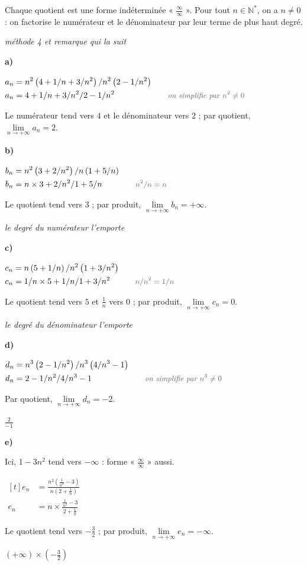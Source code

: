 \documentclass[11pt,a4paper]{article}
\newcommand{\Ns}{\mathbb{N}^{*}}
\newcounter{exo}
\newenvironment{exo}[1][\relax]{\refstepcounter{exo}\begin{exercice}[#1]}{\end{exercice}}
\newcommand{\res}[1]{{\color{coulRep}#1}}
\newenvironment{calculs}{\par\smallskip\noindent$\displaystyle\begin{aligned}[t]}%
  {\end{aligned}$\par\smallskip}
\newcommand{\justif}[1]{\quad\text{\small\itshape\color{black!60}#1}}
\newcommand{\cas}[1]{\par\smallskip\noindent\textbf{\color{coulExo}#1}\vadjust{\nobreak}}
\newcommand{\explique}[2]{\par\smallskip\noindent
  \begin{minipage}[t]{0.6\linewidth}\raggedright #1\end{minipage}\hfill
  \begin{minipage}[t]{0.37\linewidth}\raggedright\leavevmode
    {\small\itshape\color{black!60}#2}\end{minipage}\par}
\let\casligne\cas
\renewcommand{\cas}[1]{\casligne{#1}\par\nopagebreak}
\newcommand{\limn}{\lim\limits_{n\to+\infty}}
\begin{document}
\begin{exo}[Quotients]
\explique{Chaque quotient est une forme indéterminée « $\frac{\infty}{\infty}$ ». Pour tout
$n\in\Ns$, on a $n\neq 0$ : on factorise le numérateur et le dénominateur par leur terme de
plus haut degré.}{méthode 4 et remarque qui la suit}
\cas{a)}
\begin{calculs}
a_{n} &= \frac{n^{2}\left(4+\frac{1}{n}+\frac{3}{n^{2}}\right)}{n^{2}\left(2-\frac{1}{n^{2}}\right)} &&\\
a_{n} &= \frac{4+\frac{1}{n}+\frac{3}{n^{2}}}{2-\frac{1}{n^{2}}} &&\justif{on simplifie par $n^{2}\neq 0$}
\end{calculs}
\explique{Le numérateur tend vers $4$ et le dénominateur vers $2$ ; par quotient,
\res{$\limn a_{n}=2$}.}{}
\cas{b)}
\begin{calculs}
b_{n} &= \frac{n^{2}\left(3+\frac{2}{n^{2}}\right)}{n\left(1+\frac{5}{n}\right)} &&\\
b_{n} &= n\times\frac{3+\frac{2}{n^{2}}}{1+\frac{5}{n}} &&\justif{$\frac{n^{2}}{n}=n$}
\end{calculs}
\explique{Le quotient tend vers $3$ ; par produit, \res{$\limn b_{n}=+\infty$}.}{le degré du
numérateur l'emporte}
\cas{c)}
\begin{calculs}
c_{n} &= \frac{n\left(5+\frac{1}{n}\right)}{n^{2}\left(1+\frac{3}{n^{2}}\right)} &&\\
c_{n} &= \frac{1}{n}\times\frac{5+\frac{1}{n}}{1+\frac{3}{n^{2}}} &&\justif{$\frac{n}{n^{2}}=\frac{1}{n}$}
\end{calculs}
\explique{Le quotient tend vers $5$ et $\frac{1}{n}$ vers $0$ ; par produit,
\res{$\limn c_{n}=0$}.}{le degré du dénominateur l'emporte}
\cas{d)}
\begin{calculs}
d_{n} &= \frac{n^{3}\left(2-\frac{1}{n^{2}}\right)}{n^{3}\left(\frac{4}{n^{3}}-1\right)} &&\\
d_{n} &= \frac{2-\frac{1}{n^{2}}}{\frac{4}{n^{3}}-1} &&\justif{on simplifie par $n^{3}\neq 0$}
\end{calculs}
\explique{Par quotient, \res{$\limn d_{n}=-2$}.}{$\frac{2}{-1}$}
\cas{e)}
\explique{Ici, $1-3n^{2}$ tend vers $-\infty$ : forme « $\frac{\infty}{\infty}$ » aussi.}{}
\begin{calculs}
e_{n} &= \frac{n^{2}\left(\frac{1}{n^{2}}-3\right)}{n\left(2+\frac{1}{n}\right)} &&\\
e_{n} &= n\times\frac{\frac{1}{n^{2}}-3}{2+\frac{1}{n}} &&
\end{calculs}
\explique{Le quotient tend vers $-\frac{3}{2}$ ; par produit,
\res{$\limn e_{n}=-\infty$}.}{$(+\infty)\times\left(-\frac{3}{2}\right)$}
\end{exo}
\end{document}
